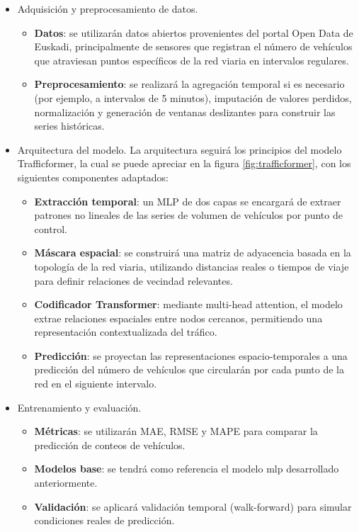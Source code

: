 \begin{itemize}
	\item Adquisición y preprocesamiento de datos.
	\begin{itemize}
		\item \textbf{Datos}: se utilizarán datos abiertos provenientes del portal Open Data de Euskadi, principalmente de sensores que registran el número de vehículos que atraviesan puntos específicos de la red viaria en intervalos regulares.
		\item \textbf{Preprocesamiento}: se realizará la agregación temporal si es necesario (por ejemplo, a intervalos de 5 minutos), imputación de valores perdidos, normalización y generación de ventanas deslizantes para construir las series históricas.
	\end{itemize}
	\item Arquitectura del modelo. La arquitectura seguirá los principios del modelo Trafficformer, la cual se puede apreciar en la figura \ref{fig:trafficformer}, con los siguientes componentes adaptados:
	\begin{itemize}
		\item \textbf{Extracción temporal}: un MLP de dos capas se encargará de extraer patrones no lineales de las series de volumen de vehículos por punto de control.
		\item \textbf{Máscara espacial}: se construirá una matriz de adyacencia basada en la topología de la red viaria, utilizando distancias reales o tiempos de viaje para definir relaciones de vecindad relevantes.
		\item \textbf{Codificador Transformer}: mediante multi-head attention, el modelo extrae relaciones espaciales entre nodos cercanos, permitiendo una representación contextualizada del tráfico.
		\item \textbf{Predicción}: se proyectan las representaciones espacio-temporales a una predicción del número de vehículos que circularán por cada punto de la red en el siguiente intervalo.
	\end{itemize}
	\item Entrenamiento y evaluación.
	\begin{itemize}
		\item \textbf{Métricas}: se utilizarán MAE, RMSE y MAPE para comparar la predicción de conteos de vehículos.
		\item \textbf{Modelos base}: se tendrá como referencia el modelo \acrshort{mlp} desarrollado anteriormente.
		\item \textbf{Validación}: se aplicará validación temporal (walk-forward) para simular condiciones reales de predicción.
	\end{itemize}
\end{itemize}

